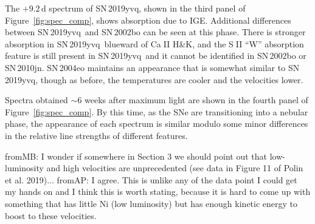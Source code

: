 \documentclass[twocolumn]{aastex63}
\def\ion#1#2{#1$\;${\footnotesize\rm{#2}}\relax}
\newcommand{\frommb}[1]{{\color{purple} fromMB: {#1}}}
\newcommand{\fromabi}[1]{{\color{teal} fromAP: {#1}}}
\newcommand{\sn}{SN\,2019yvq}
\begin{document}
The $+9.2$\,d spectrum of \sn, shown in the third panel of
Figure~\ref{fig:spec_comp}, shows absorption due to IGE. Additional
differences between \sn\ and SN\,2002bo can be seen at this phase. There is
stronger absorption in \sn\ blueward of \ion{Ca}{II} H\&K, and the \ion{S}{II}
``W'' absorption feature is still present in \sn\ and it cannot be identified
in SN\,2002bo or SN\,2010jn. SN\,2004eo maintains an appearance that is
somewhat similar to \sn, though as before, the temperatures are cooler and the
velocities lower.

Spectra obtained $\sim$6 weeks after maximum light are shown in the fourth
panel of Figure~\ref{fig:spec_comp}. By this time, as the SNe are
transitioning into a nebular phase, the appearance of each spectrum is similar
modulo some minor differences in the relative line strengths of different
features.

\frommb{I wonder if somewhere in Section 3 we should point out that
low-luminosity and high velocities are unprecedented (see data in Figure 11 of
Polin et al. 2019)...} \fromabi{I agree. This is unlike any of the data point
I could get my hands on and I think this is worth stating, because it is hard
to come up with something that has little Ni (low luminosity) but has enough
kinetic energy to boost to these velocities.}

\end{document}
